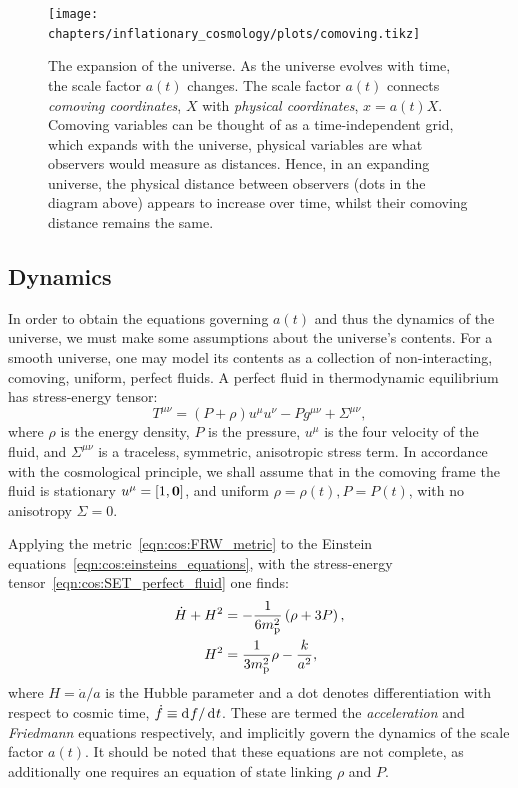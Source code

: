 \begin{figure}[tp]
  \centering
  \texttt{[image: chapters/inflationary\_cosmology/plots/comoving.tikz]}
  \caption{The expansion of the universe. As the universe evolves with time, the scale factor \(a(t)\) changes. The scale factor \(a(t)\) connects {\em comoving coordinates}, \(X\) with {\em physical coordinates}, \(x=a(t)X\). Comoving variables can be thought of as a time-independent grid, which expands with the universe, physical variables are what observers would measure as distances. Hence, in an expanding universe, the physical distance between observers (dots in the diagram above) appears to increase over time, whilst their comoving distance remains the same.}\label{fig:cos:comoving_vs_physical}
\end{figure}


\subsection{Dynamics}
In order to obtain the equations governing \(a(t)\) and thus the dynamics of the universe, we must make some assumptions about the universe's contents. For a smooth universe, one may model its contents as a collection of non-interacting, comoving, uniform, perfect fluids. A perfect fluid in thermodynamic equilibrium has stress-energy tensor:
\begin{equation}
  T^{\mu\nu} = (P+\rho)u^{\mu}u^{\nu} - P g^{\mu\nu} + \Sigma^{\mu\nu},
  \label{eqn:cos:SET_perfect_fluid}
\end{equation}
where \(\rho\) is the energy density, \(P\) is the pressure, \(u^\mu\) is the four velocity of the fluid, and \(\Sigma^{\mu\nu}\) is a traceless, symmetric, anisotropic stress term. In accordance with the cosmological principle, we shall assume that in the comoving frame the fluid is stationary \(u^\mu = [1,\mathbf{0}]\), and uniform \(\rho=\rho(t),P=P(t)\), with no anisotropy \(\Sigma=0\).  

Applying the metric~\eqref{eqn:cos:FRW_metric} to the Einstein equations~\eqref{eqn:cos:einsteins_equations}, with the stress-energy tensor~\eqref{eqn:cos:SET_perfect_fluid} one finds:
\begin{align}
  \dot{H}+H^2 &= 
  -\frac{1}{6m_{\mathrm{p}}^2}\left( \rho + 3P\right), 
  \label{eqn:cos:Raychaudhuri}
  \\
  H^2 &= 
  \frac{1}{3m_{\mathrm{p}}^2}\rho - \frac{k}{a^2}, 
  \label{eqn:cos:Friedmann}
\end{align}
%
where \(H=\dot{a}/a\) is the Hubble parameter and a dot denotes differentiation with respect to cosmic time, \(\dot{f}\equiv \operatorname{d}^{}\!{f}/\operatorname{d}^{}\!{t}\). These are termed the {\em acceleration\/} and {\em Friedmann\/} equations respectively, and implicitly govern the dynamics of the scale factor \(a(t)\). It should be noted that these equations are not complete, as additionally one requires an equation of state linking \(\rho\) and \(P\).

